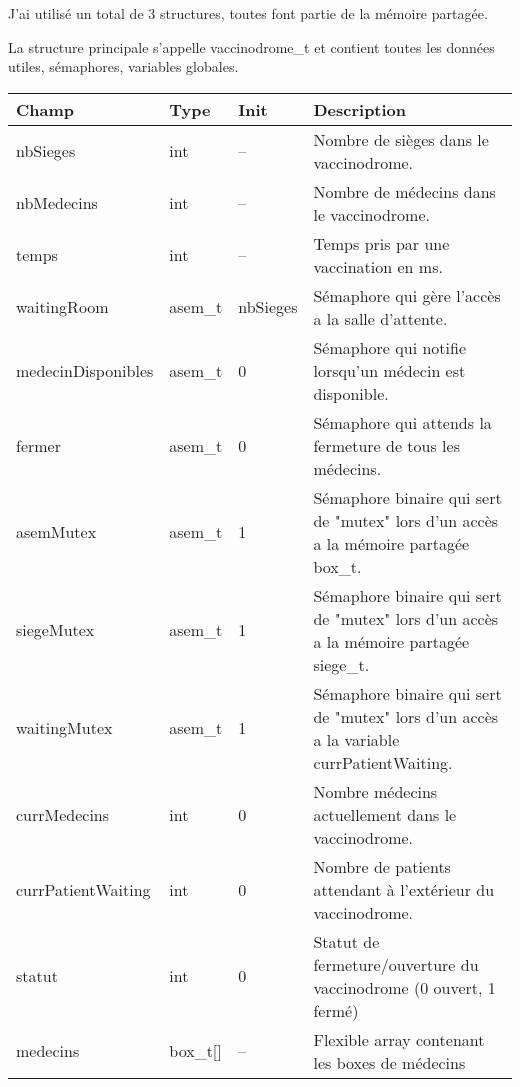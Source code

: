 \documentclass[a4paper]{article}
\makeatletter
\newenvironment{expl}{%
  \begin{list}{}{%
    \small\itshape%
    \topsep\z@%
    \listparindent0pt%
    \parsep0.75\baselineskip%
    \setlength{\leftmargin}{20mm}%
    \setlength{\rightmargin}{20mm}%
  }
    \item[]}%
    {\end{list}}
\makeatother
\begin{document}
  \begin{expl}
    J'ai utilisé un total de 3 structures, toutes font partie de la mémoire partagée.

    La structure principale s'appelle vaccinodrome\_t et contient toutes les données utiles,
    sémaphores, variables globales.

    \begin{tabularx}{\linewidth}{|l|l|l|X|}
      \hline
      Champ & Type & Init & Description \\ \hline%
      nbSieges & int & -- & Nombre de sièges dans le vaccinodrome. \\ \hline%
      nbMedecins & int & -- & Nombre de médecins dans le vaccinodrome. \\ \hline%
      temps & int & -- & Temps pris par une vaccination en ms. \\ \hline%

      waitingRoom & asem\_t & nbSieges & Sémaphore qui gère l'accès a la salle d'attente. \\ \hline%
      medecinDisponibles & asem\_t & 0 & Sémaphore qui notifie lorsqu'un médecin est disponible. \\ \hline%
      fermer & asem\_t & 0 & Sémaphore qui attends la fermeture de tous les médecins. \\ \hline%

      asemMutex & asem\_t & 1 & Sémaphore binaire qui sert de "mutex" lors d'un accès a la mémoire partagée box\_t. \\ \hline%
      siegeMutex & asem\_t & 1 & Sémaphore binaire qui sert de "mutex" lors d'un accès a la mémoire partagée siege\_t. \\ \hline%
      waitingMutex & asem\_t & 1 & Sémaphore binaire qui sert de "mutex" lors d'un accès a la variable currPatientWaiting. \\ \hline%

      currMedecins & int & 0 & Nombre médecins actuellement dans le vaccinodrome. \\ \hline%
      currPatientWaiting & int & 0 & Nombre de patients attendant à l'extérieur du vaccinodrome. \\ \hline%
      statut & int & 0 & Statut de fermeture/ouverture du vaccinodrome (0 ouvert, 1 fermé) \\ \hline%
      medecins & box\_t[] & -- & Flexible array contenant les boxes de médecins \\ \hline%


\end{tabularx}
\end{expl}
\end{document}
